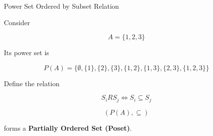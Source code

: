 \documentclass[aspectratio=169]{beamer}
\begin{document}
\begin{frame}{Power Set Ordered by Subset Relation}

Consider

\[
A=\{1,2,3\}
\]

Its power set is

\[
P(A)=
\{
\emptyset,
\{1\},
\{2\},
\{3\},
\{1,2\},
\{1,3\},
\{2,3\},
\{1,2,3\}
\}
\]

Define the relation

\[
S_iRS_j
\iff
S_i\subseteq S_j
\]


\[
(P(A),\subseteq)
\]

forms a \textbf{Partially Ordered Set (Poset)}.

\vspace{0.3cm}


\end{frame}
\end{document}
